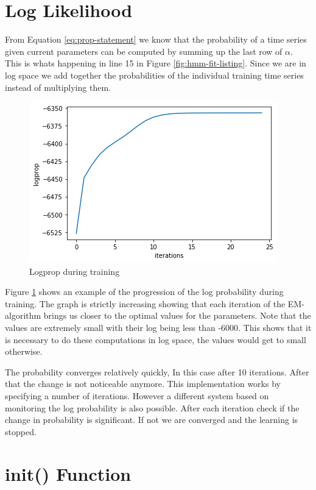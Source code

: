 \section{Log Likelihood}

From Equation \eqref{eq:prop-statement} we know that the probability of a time series given current parameters can be computed by summing up the last row of $\alpha$. This is whats happening in line 15 in Figure \ref{fig:hmm-fit-listing}. Since we are in log space we add together the probabilities of the individual training time series instead of multiplying them.

\begin{figure}
   \includegraphics{figures/logprop.png}
   \caption{Logprop during training}
      
   \label{fig:lopprop-graph}
\end{figure}

Figure \ref{fig:lopprop-graph} shows an example of the progression of the log probability during training. The graph is strictly increasing showing that each iteration of the EM-algorithm brings us closer to the optimal values for the parameters. Note that the values are extremely small with their log being less than -6000. This shows that it is necessary to do these computations in log space, the values would get to small otherwise. 

The probability converges relatively quickly, In this case after 10 iterations. After that the change is not noticeable anymore. This implementation works by specifying a number of iterations. However a different system based on monitoring the log probability is also possible. After each iteration check if the change in probability is significant. If not we are converged and the learning is stopped.

\section{init() Function}

